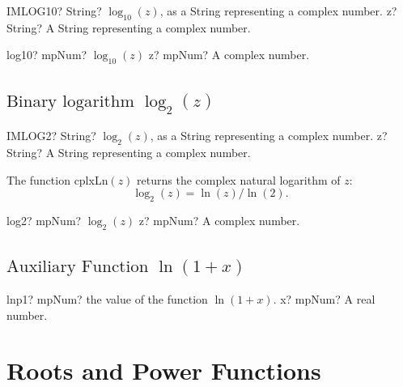 \vspace{0.6cm}
\begin{mpFunctionsExtract}
	\mpWorksheetFunctionOneNotImplemented
	{IMLOG10? String? $\log_{10}(z)$, as a String representing a complex number.}
	{z? String? A String representing a complex number.}
\end{mpFunctionsExtract}


\begin{mpFunctionsExtract}
	\mpFunctionOne
	{log10? mpNum? $\log_{10}(z)$}
	{z? mpNum? A complex number.}
\end{mpFunctionsExtract}



\subsection{\texorpdfstring{$\text{Binary logarithm }\log_2(z)$}{log2}}

\vspace{0.6cm}
\begin{mpFunctionsExtract}
	\mpWorksheetFunctionOneNotImplemented
	{IMLOG2? String? $\log_{2}(z)$, as a String representing a complex number.}
	{z? String? A String representing a complex number.}
\end{mpFunctionsExtract}

\vspace{0.3cm}
The function \textsf{cplxLn$(z)$} returns the complex natural logarithm of $z$: 
\begin{equation}
	\log_{2}(z) =  \ln(z)/\ln(2).
\end{equation}


\begin{mpFunctionsExtract}
	\mpFunctionOne
	{log2? mpNum? $\log_{2}(z)$}
	{z? mpNum? A complex number.}
\end{mpFunctionsExtract}


\subsection{\texorpdfstring{$\text{Auxiliary Function }\ln(1+x)$}{lnp1}}

\begin{mpFunctionsExtract}
	\mpFunctionOne
	{lnp1? mpNum? the value of the function $\ln(1+x)$.}
	{x? mpNum? A real number.}
\end{mpFunctionsExtract}






\newpage
\section{Roots and Power Functions}
\label{RootsAndPowersCplx}


